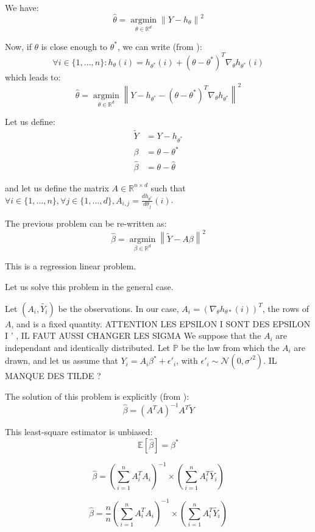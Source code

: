 We have:
\[
\hat{\theta} =  \underset{\theta \in \mathbb{R}^d}{\operatorname{argmin}}  \left\lVert Y - h_\theta \right\rVert ^2
\]

Now, if $\theta$ is close enough to $\theta^*$, we can write (from \cite*{ruckstuhl2010introduction}):
\[
\forall i \in \{ 1, ..., n\} :  h_\theta(i) = h_{\theta^*} (i ) + (\theta - \theta^*)^T\nabla_\theta h_{\theta^*}(i) 
\]
which leads to:
\[
\hat{\theta} =  \underset{\theta \in \mathbb{R}^d}{\operatorname{argmin}}  \left\lVert Y - h_{\theta^*}  - (\theta - \theta^*)^T\nabla_\theta h_{\theta^*}\right\rVert ^2
\]

Let us define:
\begin{align*}
\tilde{Y} &= Y - h_{\theta^*} \\
\beta &= \theta - \theta^* \\
\hat{\beta} &= \theta - \hat{\theta}
\end{align*}

and let us define the matrix $A \in \mathbb{R} ^{n \times d }$ such that $\forall i \in \{ 1, ..., n\}, \forall j \in \{1, ..., d\}, A_{i, j} = \frac{dh_{\theta^*}}{d\theta_j}(i)$.

The previous problem can be re-written as:
\[
\hat{\beta} =  \underset{\beta \in \mathbb{R}^d}{\operatorname{argmin}}  \left\lVert \tilde{Y} - A \beta \right\rVert ^2
\]

This is a regression linear problem.

Let us solve this problem in the general case.

Let $(A_i, \tilde{Y_i})$ be the observations.
In our case, $A_i = (\nabla_\theta h_{\theta*} (i))^T$, the rows of $A$,  and is a fixed quantity.  
ATTENTION LES EPSILON I SONT DES EPSILON I ' , IL FAUT AUSSI CHANGER LES SIGMA 
We suppose that the $A_i$ are independant and identically distributed. 
Let $\mathbb{P}$ be the law from which the $A_i$ are drawn, and let us assume that $Y_i = A_i \beta ^* + \epsilon'_i $, with $\epsilon'_i \sim \mathcal{N}(0, \sigma'^2)$.
IL MANQUE DES TILDE ?

The solution of this problem is explicitly (from \cite*{powellasymptoticsforleastsquares}):
\[
\hat{\beta } = (A^T A ) ^{-1} A^T \tilde{Y}
\]

This least-square estimator is unbiased:
\[
\mathbb{E}[\hat{\beta}] = \beta^*
\]

\[
\hat {\beta } = \left(  \sum_{i=1}^{n}   A_i ^T A_i \right) ^{-1}    \times \left(  \sum_{i=1}^{n} A_i ^T \tilde{Y_i } \right)
\]

\[
\hat {\beta } =\frac{n}{n} \left(  \sum_{i=1}^{n}   A_i ^T A_i \right) ^{-1}    \times \left(  \sum_{i=1}^{n} A_i ^T \tilde{Y_i } \right)
\]

